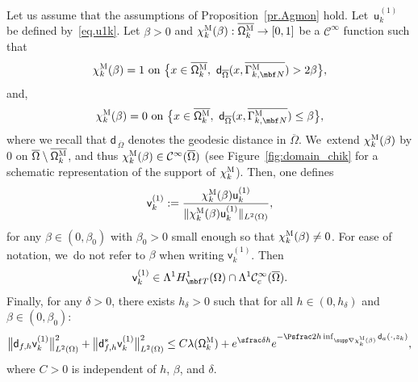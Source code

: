 \begin{proposition}\label{pr.AgmonQM}
Let us assume that the assumptions of Proposition~\ref{pr.Agmon} hold.
Let~$\mathsf u^{(1)}_k$ be defined by~\eqref{eq.u1k}.
Let $\beta>0$ and $\chi_k^{\textsc{M}} (\beta): \overline{ \mathsf \Omega_k^{\textsc{M}}} \to [0,1]$ be a $\mathcal C^\infty$ function such that
\begin{equation}\label{eq.supp-close1}
\chi_k^{\textsc{M}} (\beta)=1 \text{ on } \big \{x\in \overline{ \mathsf \Omega_k^{\textsc{M}}}, \ \mathsf d_{\overline \Omega}(x, \overline{\Gamma_{k,\mbf N}^{\textsc{M}}})>2\beta\big \},
\end{equation}
and,
\begin{equation}\label{eq.supp-close2}
\chi_k^{\textsc{M}} (\beta)=0 \text{ on }\big \{x\in \overline{ \mathsf \Omega_k^{\textsc{M}}}, \ \mathsf d_{\overline \Omega}(x, \overline{\Gamma_{k,\mbf N}^{\textsc{M}}})\le \beta\big \},
\end{equation}
where we recall that $\mathsf d_{\, \overline \Omega}$ denotes the geodesic distance in $\overline \Omega$. We~extend $ \chi_k^{\textsc{M}} (\beta)$ by $0$ on $\overline{\Omega}\setminus \overline{ \mathsf \Omega_k^{\textsc{M}}}$, and thus $\chi_k^{\textsc{M}} (\beta)\in \mathcal C^\infty(\overline \Omega)$ (see Figure~\ref{fig:domain_chik} for a schematic representation of the support of $ \chi_k^{\textsc{M}}$).
Then, one defines
\begin{equation}\label{eq.QM1}
\mathsf v_k^{(1)}:=\frac{ \chi_k^{\textsc{M}} (\beta) \mathsf u_k^{(1)} }{\Vert \chi_k^{\textsc{M}} (\beta)\mathsf u_k^{(1)}\Vert _{ L^2 (\Omega) }},
\end{equation}
for any $\beta \in (0,\beta_0)$ with $\beta_0>0$ small enough so that
$\chi_k^{\textsc{M}} (\beta) \neq 0$.
For ease of notation, we~do not refer to $\beta$ when writing $\mathsf v_k^{(1)}$.
Then
\[
\mathsf v_k^{(1)}\in \Lambda^1H^1_{\mbf T}(\Omega) \cap \Lambda^1\mathcal C^\infty_c (\overline \Omega).
\]
Finally, for any $\delta>0$, there exists $h_\delta>0$ such that for
all $h\in (0,h_\delta)$ and $\beta \in (0,\beta_0)$:
\[
\big \| \mathsf d_{f,h} \mathsf v_k^{(1)} \big \|^{2}_{ L^{2} (\Omega)}+
\big \| \mathsf d^{*}_{f,h} \mathsf v_k^{(1)} \big \|^{2}_{ L^{2} (\Omega)}\le C\lambda(\mathsf \Omega_k^{\textsc{M}})+ e^{\sfrac \delta h} e^{-\Psfrac 2h \inf_{\supp \nabla \chi_k^{\textsc{M}} (\beta)} \mathsf d_a(\cdot,z_k)},
\]
where $C>0$ is independent of $h$, $\beta$, and $\delta$.
\end{proposition}

